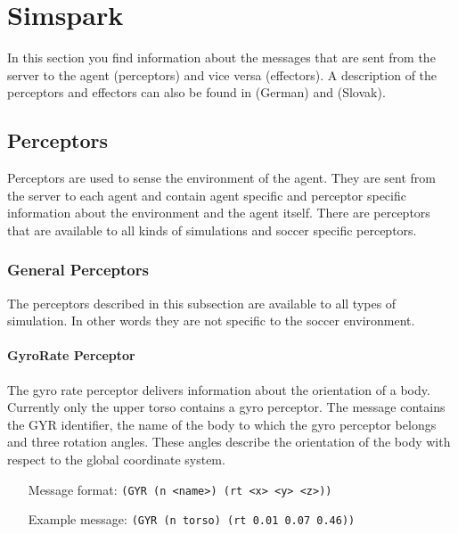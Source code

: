 \chapter{Simspark}

In this section you find information about the messages that are sent from the
server to the agent (perceptors) and vice versa (effectors). A description of
the perceptors and effectors can also be found in \cite{SchillingJ} (German) and \cite{Lekavy} (Slovak).

\section{Perceptors}
Perceptors are used to sense the environment of the agent. They are sent from
the server to each agent and contain agent specific and perceptor specific
information about the environment and the agent itself. There are perceptors
that are available to all kinds of simulations and soccer specific perceptors.

\subsection{General Perceptors}
The perceptors described in this subsection are available to all types of
simulation. In other words they are not specific to the soccer environment.

\subsubsection{GyroRate Perceptor}
The gyro rate perceptor delivers information about the orientation of a body.
Currently only the upper torso contains a gyro perceptor.
The message contains the GYR identifier, the name of the body to which the gyro
perceptor belongs and three rotation angles. These angles describe the
orientation of the body with respect to the global coordinate system.
\begin{itemize}
	\item[Message format:] \texttt{(GYR (n <name>) (rt <x> <y> <z>))}
	\item[Example message:] \texttt{(GYR (n torso) (rt 0.01 0.07 0.46))}
\end{itemize}


